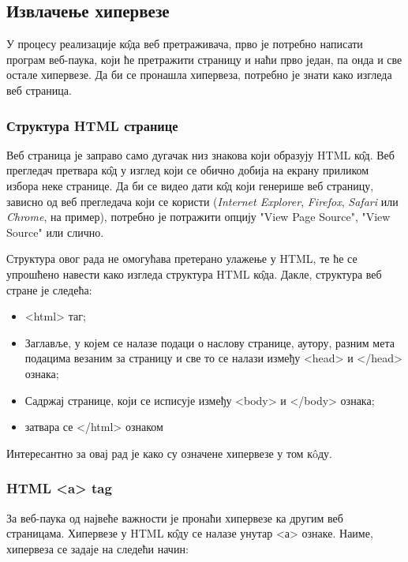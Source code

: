 \subsection{Извлачење хипервезе}

У процесу реализације к\^{о}да веб претраживача, прво је потребно написати програм веб-паука, који ће претражити страницу и наћи прво један, па онда и све остале хипервезе. Да би се пронашла хипервеза, потребно је знати како изгледа веб страница.

\subsubsection{Структура HTML странице}
Веб страница је заправо само дугачак низ знакова који образују HTML к\^{о}д. Веб прегледач претвара к\^{о}д у изглед који се обично добија на екрану приликом избора неке странице. Да би се видео дати к\^{о}д који генерише веб страницу,  зависно од веб прегледача који се користи (\emph{Internet Explorer}, \emph{Firefox}, \emph{Safari} или \emph{Chrome}, на пример), потребно је потражити опцију "View Page Source", "View Source" или слично.

Структура овог рада не омогућава претерано улажење у HTML, те ће се упрошћено навести како изгледа структура HTML к\^{о}да\cite{strukturaHTML}. Дакле, структура веб стране је следећа:

\begin{itemize}
\item <html> таг;
\item Заглавље, у којем се налазе подаци о наслову странице, аутору, разним  мета подацима везаним за страницу и све то се налази између <head> и </head> ознака;
\item Садржај странице, који се исписује између <body> и </body> ознака;
\item затвара се </html> ознаком
\end{itemize}

Интересантно за овај рад је како су означене хипервезе у том к\^{o}ду.

\subsubsection{HTML <a> tag}
За веб-паука од највеће важности је пронаћи хипервезе ка другим  веб страницама. Хипервезе у HTML к\^{о}ду се налазе унутар <а> ознаке. Наиме, хипервеза се задаје на следећи начин:

